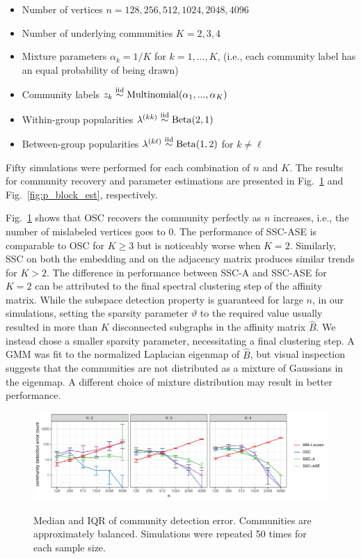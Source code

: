\documentclass[12pt]{article}
\providecommand{\tightlist}{%
  \setlength{\itemsep}{0pt}\setlength{\parskip}{0pt}}
\begin{document}
\begin{itemize}
\tightlist
\item
  Number of vertices \(n = 128, 256, 512, 1024, 2048, 4096\)
\item
  Number of underlying communities \(K = 2, 3, 4\)
\item
  Mixture parameters \(\alpha_k = 1 / K\) for \(k = 1, ..., K\), (i.e.,
  each community label has an equal probability of being drawn)
\item
  Community labels
  \(z_k \stackrel{\text{iid}}{\sim} \mathrm{Multinomial}(\alpha_1, ..., \alpha_K)\)
\item
  Within-group popularities
  \(\lambda^{(kk)} \stackrel{\text{iid}}{\sim} \mathrm{Beta}(2, 1)\)
\item
  Between-group popularities
  \(\lambda^{(k \ell)} \stackrel{\text{iid}}{\sim} \mathrm{Beta}(1, 2)\) for
  \(k \neq \ell\)
\end{itemize}
Fifty simulations were performed for each combination of $n$ and
$K$. The results for community recovery and parameter estimations are
presented in Fig.~\ref{fig:clust_err_ct_sim} and
Fig.~\ref{fig:p_block_est}, respectively.

Fig.~\ref{fig:clust_err_ct_sim} shows that OSC recovers the community
perfectly as $n$ increases, i.e., the number of mislabeled vertices
goes to $0$. The performance of SSC-ASE is comparable to OSC for $K
\geq 3$ but is noticeably worse when $K = 2$. Similarly, SSC on both the embedding and on the
adjacency matrix produces similar trends for \(K > 2\). The difference
in performance between SSC-A and SSC-ASE for \(K = 2\) can be attributed to the final spectral
clustering step of the affinity matrix. While the subspace detection
property is guaranteed for large $n$, in our simulations, setting the
sparsity parameter $\vartheta$ to the required value usually resulted
in more than $K$ disconnected subgraphs in the affinity matrix
$\hat{B}$.  
We instead chose a smaller sparsity parameter, 
necessitating a final clustering step. 
A GMM was fit to the normalized Laplacian eigenmap of $\hat{B}$,
but visual inspection suggests that the communities are not
distributed as a mixture of Gaussians in the eigenmap. 
A different choice of mixture distribution may result in better performance. 

\begin{figure}[tp]
{\centering \includegraphics{summary_files/figure-latex/clust_err_ct_sim-1}
}

\caption{Median and IQR of community detection error. Communities are approximately balanced. Simulations were repeated 50 times for each sample size.}\label{fig:clust_err_ct_sim}
\end{figure}
\end{document}

